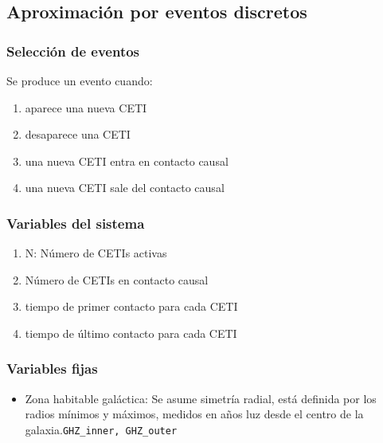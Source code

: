 \documentclass[handout]{beamer}
\theoremstyle{plain}
\theoremstyle{definition}
\theoremstyle{remark}
\begin{document}
\subsection{Aproximación por eventos discretos}


\begin{frame}\frametitle{Selección de eventos}

   Se produce un evento cuando:

   \begin{enumerate}
     \item aparece una nueva CETI
     \item desaparece una CETI
     \item una nueva CETI entra en contacto causal
     \item una nueva CETI sale del contacto causal
   \end{enumerate}

\end{frame}  %

\begin{frame}\frametitle{Variables del sistema}

   \begin{enumerate}
     \item N: Número de CETIs activas
     \item Número de CETIs en contacto causal
     \item tiempo de primer contacto para cada CETI
     \item tiempo de último contacto para cada CETI
   \end{enumerate}

\end{frame}  %
 
\begin{frame}\frametitle{Variables fijas}

   \begin{itemize}
      \item Zona habitable galáctica: Se asume simetría radial, está
         definida por los radios mínimos y máximos, medidos en a\~nos
         luz desde el centro de la galaxia.\texttt{GHZ\_inner, GHZ\_outer}
   \end{itemize}

\end{frame}  %
 
\end{document}
